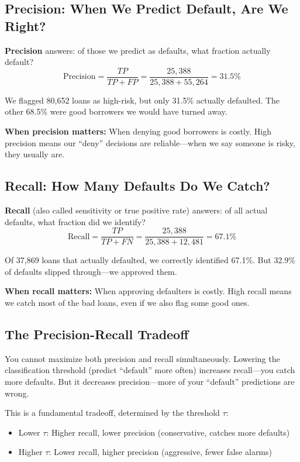 \documentclass[11pt,a4paper]{article}
\newcommand{\keyword}[1]{\textbf{\textcolor{AccentOrange}{#1}}}
\begin{document}
\subsection{Precision: When We Predict Default, Are We Right?}

\keyword{Precision} answers: of those we predict as defaults, what fraction actually default?
\[
\text{Precision} = \frac{TP}{TP + FP} = \frac{25,388}{25,388 + 55,264} = 31.5\%
\]

We flagged 80,652 loans as high-risk, but only 31.5\% actually defaulted. The other 68.5\% were good borrowers we would have turned away.

\textbf{When precision matters:} When denying good borrowers is costly. High precision means our ``deny'' decisions are reliable---when we say someone is risky, they usually are.

\subsection{Recall: How Many Defaults Do We Catch?}

\keyword{Recall} (also called sensitivity or true positive rate) answers: of all actual defaults, what fraction did we identify?
\[
\text{Recall} = \frac{TP}{TP + FN} = \frac{25,388}{25,388 + 12,481} = 67.1\%
\]

Of 37,869 loans that actually defaulted, we correctly identified 67.1\%. But 32.9\% of defaults slipped through---we approved them.

\textbf{When recall matters:} When approving defaulters is costly. High recall means we catch most of the bad loans, even if we also flag some good ones.

\subsection{The Precision-Recall Tradeoff}

You cannot maximize both precision and recall simultaneously. Lowering the classification threshold (predict ``default'' more often) increases recall---you catch more defaults. But it decreases precision---more of your ``default'' predictions are wrong.

This is a fundamental tradeoff, determined by the threshold $\tau$:
\begin{itemize}
    \item Lower $\tau$: Higher recall, lower precision (conservative, catches more defaults)
    \item Higher $\tau$: Lower recall, higher precision (aggressive, fewer false alarms)
\end{itemize}
\end{document}
